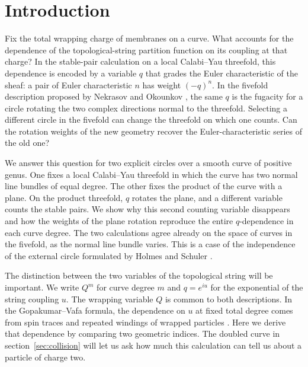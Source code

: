 \section{Introduction}\label{sec:intro}

Fix the total wrapping charge of membranes on a curve. What accounts
for the dependence of the topological-string partition function on its
coupling at that charge? In the stable-pair calculation on a local
Calabi--Yau threefold, this dependence is encoded by a variable $q$
that grades the Euler characteristic of the sheaf: a pair of Euler
characteristic $n$ has weight $(-q)^n$. In the fivefold description
proposed by Nekrasov and Okounkov \cite{no}, the same $q$ is the
fugacity for a circle rotating the two complex directions normal to
the threefold. Selecting a different circle in the fivefold can change
the threefold on which one counts. Can the rotation weights of the new
geometry recover the Euler-characteristic series of the old one?

We answer this question for two explicit circles over a smooth curve
of positive genus. One fixes a local Calabi--Yau threefold in which the
curve has two normal line bundles of equal degree. The other fixes
the product of the curve with a plane. On the product threefold, $q$
rotates the plane, and a different variable counts the stable pairs.
We show why this second counting variable disappears and how the
weights of the plane rotation reproduce the entire $q$-dependence in
each curve degree. The two calculations agree already on the space of
curves in the fivefold, as the normal line bundle varies. This is a
case of the independence of the external circle formulated by Holmes
and Schuler \cite[Conjecture~1.7 and Examples~1.13--1.14]{holmesschuler}.

The distinction between the two variables of the topological string
will be important. We write $Q^m$ for curve degree $m$ and $q=e^{iu}$
for the exponential of the string coupling $u$. The wrapping variable $Q$ is common to both descriptions. In the Gopakumar--Vafa formula, the dependence on $u$
at fixed total degree comes from spin traces and repeated windings of
wrapped particles \cite{gv,dw}. Here we derive that dependence by
comparing two geometric indices. The doubled curve in
section~\ref{sec:collision} will let us ask how much this calculation
can tell us about a particle of charge two.

